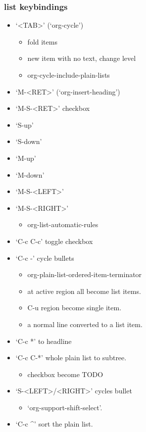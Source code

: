\documentclass[11pt]{article}
\begin{document}
\subsubsection{list keybindings}
\label{sec:org34f917a}
\begin{itemize}
\item ‘<TAB>’     (‘org-cycle’)    
\begin{itemize}
\item fold items
\item new item with no text, change level
\item org-cycle-include-plain-lists
\end{itemize}
\item ‘M-<RET>’     (‘org-insert-heading’)
\item ‘M-S-<RET>’ checkbox
\item ‘S-up’
\item ‘S-down’
\item ‘M-up’
\item ‘M-down’
\item ‘M-S-<LEFT>’
\item ‘M-S-<RIGHT>’
\begin{itemize}
\item org-list-automatic-rules
\end{itemize}
\item ‘C-c C-c’ toggle checkbox
\item ‘C-c -’ cycle bullets
\begin{itemize}
\item org-plain-list-ordered-item-terminator
\item at active region all become list items.
\item C-u region become single item.
\item a normal line converted to a list item.
\end{itemize}
\item ‘C-c *’ to headline
\item ‘C-c C-*’ whole plain list to subtree.
\begin{itemize}
\item checkbox become TODO
\end{itemize}
\item ‘S-<LEFT>/<RIGHT>’ cycles bullet 
\begin{itemize}
\item ‘org-support-shift-select’.
\end{itemize}
\item ‘C-c \^{}’ sort the plain list.
\end{itemize}
\end{document}
